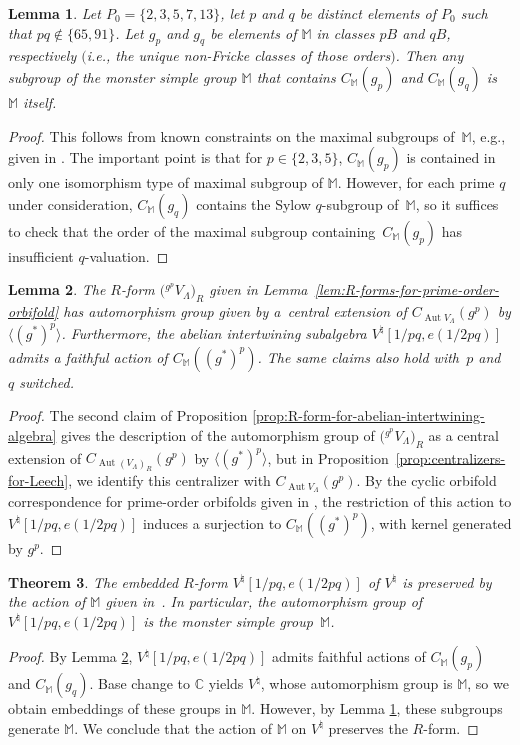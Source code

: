 \documentclass[pdftex]{sigma}
\newcommand{\bC}{\mathbb{C}}
\newcommand{\bM}{\mathbb{M}}
\DeclareMathOperator{\Aut}{Aut}
\newtheorem{thm}{Theorem}[section]
\newtheorem{lem}[thm]{Lemma}
\theoremstyle{definition}
\begin{document}
\begin{lem} \label{lem:maximal-subgroups-of-monster}
Let $P_0 = \{ 2,3,5,7,13\}$, let $p$ and $q$ be distinct elements of $P_0$ such that $pq \not\in \{65, 91\}$. Let $g_p$ and $g_q$ be elements of $\bM$ in classes $pB$ and $qB$, respectively $($i.e., the unique non-Fricke classes of those orders$)$. Then any subgroup of the monster simple group $\bM$ that contains $C_\bM(g_p)$ and $C_\bM(g_q)$ is $\bM$ itself.
\end{lem}
\begin{proof}This follows from known constraints on the maximal subgroups of~$\bM$, e.g., given in \cite{W17}. The important point is that for $p \in \{2,3,5\}$, $C_\bM(g_p)$ is contained in only one isomorphism type of maximal subgroup of $\bM$. However, for each prime $q$ under consideration, $C_\bM(g_q)$ contains the Sylow $q$-subgroup of~$\bM$, so it suffices to check that the order of the maximal subgroup containing~$C_\bM(g_p)$ has insufficient $q$-valuation.
\end{proof}

\begin{lem} \label{lem:action-of-centralizer-on-R-form}The $R$-form $\big({}^{g^p}V_\Lambda\big)_R$ given in Lemma~{\rm \ref{lem:R-forms-for-prime-order-orbifold}} has automorphism group given by a~central extension of $C_{\Aut V_\Lambda}(g^p)$ by $\langle (g^*)^p \rangle$. Furthermore, the abelian intertwining subalgebra $V^\natural[1/pq,e(1/2pq)]$ admits a faithful action of $C_\bM((g^*)^p)$. The same claims also hold with~$p$ and~$q$ switched.
\end{lem}
\begin{proof}The second claim of Proposition \ref{prop:R-form-for-abelian-intertwining-algebra} gives the description of the automorphism group of $\big({}^{g^p}V_\Lambda\big)_R$ as a central extension of $C_{\Aut (V_\Lambda)_R}(g^p)$ by $\langle (g^*)^p \rangle$, but in Proposition~\ref{prop:centralizers-for-Leech}, we identify this centralizer with $C_{\Aut V_\Lambda}(g^p)$. By the cyclic orbifold correspondence for prime-order orbifolds given in \cite{ALY17}, the restriction of this action to $V^\natural[1/pq,e(1/2pq)]$ induces a surjection to $C_\bM((g^*)^p)$, with kernel generated by $g^p$.
\end{proof}

\begin{thm} \label{thm:monster-form}The embedded $R$-form $V^\natural[1/pq,e(1/2pq)]$ of $V^\natural$ is preserved by the action of $\bM$ given in~{\rm \cite{FLM88}}. In particular, the automorphism group of $V^\natural[1/pq,e(1/2pq)]$ is the monster simple group~$\bM$.
\end{thm}
\begin{proof}
By Lemma \ref{lem:action-of-centralizer-on-R-form}, $V^\natural[1/pq,e(1/2pq)]$ admits faithful actions of $C_\bM(g_p)$ and $C_\bM(g_q)$. Base change to $\bC$ yields $V^\natural$, whose automorphism group is $\bM$, so we obtain embeddings of these groups in $\bM$. However, by Lemma \ref{lem:maximal-subgroups-of-monster}, these subgroups generate $\bM$. We conclude that the action of $\bM$ on $V^\natural$ preserves the $R$-form.
\end{proof}
\end{document}
